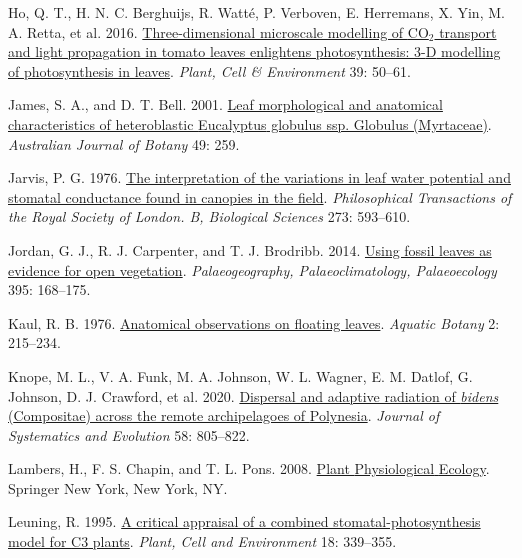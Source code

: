 \documentclass[
  letterpaper,
  DIV=11,
  numbers=noendperiod]{scrartcl}
\newlength{\cslhangindent}
\newlength{\cslentryspacingunit} %
\newenvironment{CSLReferences}[2] %
 {%
  \setlength{\parindent}{0pt}
  \ifodd #1
  \let\oldpar\par
  \def\par{\hangindent=\cslhangindent\oldpar}
  \fi
  \setlength{\parskip}{#2\cslentryspacingunit}
 }%
 {}
\begin{document}
\begin{CSLReferences}{1}{0}
\leavevmode{}%
Ho, Q. T., H. N. C. Berghuijs, R. Watté, P. Verboven, E. Herremans, X.
Yin, M. A. Retta, et al. 2016.
\href{https://doi.org/10.1111/pce.12590}{Three-dimensional microscale
modelling of {CO}\(_{\textrm{2}}\) transport and light propagation in
tomato leaves enlightens photosynthesis: 3-{D} modelling of
photosynthesis in leaves}. \emph{Plant, Cell \& Environment} 39: 50--61.

\leavevmode{}%
James, S. A., and D. T. Bell. 2001.
\href{https://doi.org/10.1071/BT99044}{Leaf morphological and anatomical
characteristics of heteroblastic {Eucalyptus} globulus ssp. Globulus
({Myrtaceae})}. \emph{Australian Journal of Botany} 49: 259.

\leavevmode{}%
Jarvis, P. G. 1976. \href{https://doi.org/10.1098/rstb.1976.0035}{The
interpretation of the variations in leaf water potential and stomatal
conductance found in canopies in the field}. \emph{Philosophical
Transactions of the Royal Society of London. B, Biological Sciences}
273: 593--610.

\leavevmode{}%
Jordan, G. J., R. J. Carpenter, and T. J. Brodribb. 2014.
\href{https://doi.org/10.1016/j.palaeo.2013.12.035}{Using fossil leaves
as evidence for open vegetation}. \emph{Palaeogeography,
Palaeoclimatology, Palaeoecology} 395: 168--175.

\leavevmode{}%
Kaul, R. B. 1976.
\href{https://doi.org/10.1016/0304-3770(76)90022-X}{Anatomical
observations on floating leaves}. \emph{Aquatic Botany} 2: 215--234.

\leavevmode{}%
Knope, M. L., V. A. Funk, M. A. Johnson, W. L. Wagner, E. M. Datlof, G.
Johnson, D. J. Crawford, et al. 2020.
\href{https://doi.org/10.1111/jse.12704}{Dispersal and adaptive
radiation of \emph{bidens} ({Compositae}) across the remote
archipelagoes of {Polynesia}}. \emph{Journal of Systematics and
Evolution} 58: 805--822.

\leavevmode{}%
Lambers, H., F. S. Chapin, and T. L. Pons. 2008.
\href{https://doi.org/10.1007/978-0-387-78341-3}{Plant {Physiological}
{Ecology}}. Springer New York, New York, NY.

\leavevmode{}%
Leuning, R. 1995.
\href{https://doi.org/10.1111/j.1365-3040.1995.tb00370.x}{A critical
appraisal of a combined stomatal-photosynthesis model for {C3} plants}.
\emph{Plant, Cell and Environment} 18: 339--355.


\end{CSLReferences}
\end{document}
